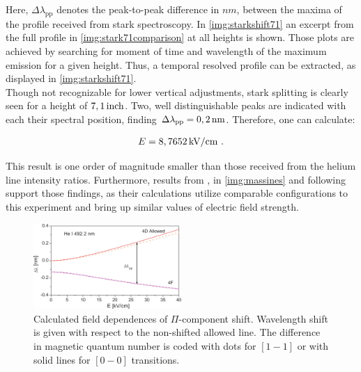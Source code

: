 \documentclass[a4paper,10pt,twoside]{article}
\newcommand{\ix}[1]{_\text{#1}}
\begin{document}
		Here, $\Delta\lambda\ix{pp}$ denotes the peak-to-peak difference in $\unit{nm}$, between the maxima of the profile received from stark spectroscopy. In \autoref{img:starkshift71} an excerpt from the full profile in \autoref{img:stark71comparison} at all heights is shown. Those plots are achieved by searching for moment of time and wavelength of the maximum emission for a given height. Thus, a temporal resolved profile can be extracted, as displayed in \autoref{img:starkshift71}.\\
		Though not recognizable for lower vertical adjustments, stark splitting is clearly seen for a height of $\unit[7,1]{inch}$. Two, well distinguishable peaks are indicated with each their spectral position, finding $\Delta\lambda\ix{pp}=\unit[0,2]{nm}$. Therefore, one can calculate:
		
			\begin{align}
				E=\unit[8,7652]{kV/cm} \,\,.\nonumber
			\end{align}
		
		This result is one order of magnitude smaller than those received from the helium line intensity ratios. Furthermore, results from \cite{Massines}, \cite{0022-3727-36-1-306} in \autoref{img:massines} and following support those findings, as their calculations utilize comparable configurations to this experiment and bring up similar values of electric field strength.
		
				\begin{figure}
					\centering
					\includegraphics[width=0.5\textwidth]{figures/stark/starkshiftfielddependence.pdf}
					\caption{Calculated field dependences of $\Pi$-component shift. Wavelength shift is given with respect to the non-shifted allowed line. The difference in magnetic quantum number is coded with dots for $[1-1]$ or with solid lines for $[0-0]$ transitions. \cite{starkshiftmeas}}
					\label{img:fieldependence}
				\end{figure}
		
\end{document}
